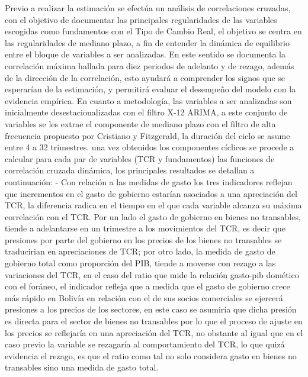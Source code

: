 \documentclass[12pt,letterpaper]{article}
\begin{document}
Previo a realizar la estimación se efectúa un análisis de correlaciones cruzadas, con el objetivo de documentar las principales regularidades de las variables escogidas como fundamentos con el Tipo de Cambio Real, el objetivo se centra en las regularidades de mediano plazo, a fin de entender la dinámica de equilibrio entre el bloque de variables a ser analizadas. En este sentido se documenta la correlación máxima hallada para diez periodos de adelanto y de rezago, además de la dirección de la correlación, esto ayudará a comprender los signos que se esperarían de la estimación, y permitirá evaluar el desempeño del modelo con la evidencia empírica.
En cuanto a metodología, las variables a ser analizadas son inicialmente desestacionalizadas con el filtro X-12 ARIMA, a este conjunto de variables se les extrae el componente de mediano plazo con el filtro de alta frecuencia propuesto por Cristiano y Fitzgerald, la duración del ciclo se asume entre 4 a 32 trimestres. una vez obtenidos los componentes cíclicos se procede a calcular para cada par de variables (TCR y fundamentos) las funciones de correlación cruzada dinámica, los principales resultados se detallan a continuación:
- Con relación a las medidas de gasto los tres indicadores reflejan que incrementos en el gasto de gobierno estarían asociados a una apreciación del TCR, la diferencia radica en el tiempo en el que cada variable alcanza su máxima correlación con el TCR. Por un lado el gasto de gobierno en bienes no transables, tiende a adelantarse en un trimestre a los movimientos del TCR, es decir que presiones por parte del gobierno en los precios de los bienes no transables se traducirian en apreciaciones de TCR; por otro lado, la medida de gasto de gobierno total como proporción del PIB, tiende a moverse con rezago a las variaciones del TCR, en el caso del ratio que mide la relación gasto-pib domético con el foráneo, el indicador refleja que a medida que el gasto de gobierno crece más rápido en Bolivía en relación con el de sus socios comerciales se ejercerá presiones a los precios de los sectores, en este caso se asumiría que dicha presión es directa para el sector de bienes no transables por lo que el proceso de ajuste en los precios se reflejaría en una apreciación del TCR, no obstante al igual que en el caso previo la variable se rezagaría al comportamiento del TCR, lo que quizá evidencia el rezago, es que el ratio como tal no solo considera gasto en bienes no transables sino una medida de gasto total. 
\end{document}
